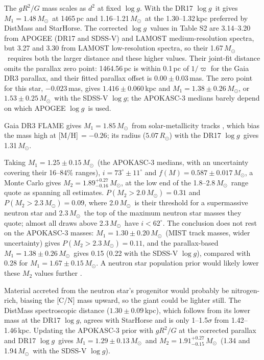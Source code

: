\documentclass{aastex701}
\newcommand{\msun}{\ensuremath{M_\odot}}
\newcommand{\rsun}{\ensuremath{R_\odot}}
\newcommand{\logg}{\ensuremath{\log g}}
\begin{document}
The $gR^2/G$ mass scales as $d^2$ at fixed \logg. With the DR17 \logg\ it gives $M_1=1.48$\,\msun\ at 1465\,pc and 1.16--1.21\,\msun\ at the 1.30--1.32\,kpc preferred by DistMass and StarHorse. The corrected \logg\ values in Table S2 are 3.14--3.20 from APOGEE (DR17 and SDSS-V) and LAMOST medium-resolution spectra, but 3.27 and 3.30 from LAMOST low-resolution spectra, so their 1.67\,\msun\ requires both the larger distance and these higher values. Their joint-fit distance omits the parallax zero point: 1464.56\,pc is within 0.1\,pc of $1/\varpi$ for the Gaia DR3 \citep{GaiaDR3} parallax, and their fitted parallax offset is $0.00\pm0.03$\,mas. The \citet{Lindegren2021} zero point for this star, $-0.023$\,mas, gives $1.416\pm0.060$\,kpc and $M_1=1.38\pm0.26$\,\msun, or $1.53\pm0.25$\,\msun\ with the SDSS-V \logg; the APOKASC-3 medians barely depend on which APOGEE \logg\ is used.

Gaia DR3 FLAME gives $M_1=1.85$\,\msun\ from solar-metallicity tracks \citep{Creevey2023}, which bias the mass high at [M/H]$\,=-0.26$; its radius ($5.07$\,\rsun) with the DR17 \logg\ gives 1.31\,\msun.

Taking $M_1=1.25\pm0.15$\,\msun\ (the APOKASC-3 medians, with an uncertainty covering their 16--84\% ranges), $i=73^\circ\pm11^\circ$ and $f(M)=0.587\pm0.017$\,\msun, a Monte Carlo gives $M_2=1.89^{+0.27}_{-0.16}$\,\msun, at the low end of the 1.8--2.8\,\msun\ range \citet{Zhao2026} quote as spanning all estimates. $P(M_2>2.0\,\msun)=0.31$ and $P(M_2>2.3\,\msun)=0.09$, where 2.0\,\msun\ is their threshold for a supermassive neutron star and 2.3\,\msun\ the top of the maximum neutron star masses they quote; almost all draws above 2.3\,\msun\ have $i<62^\circ$. The conclusion does not rest on the APOKASC-3 masses: $M_1=1.30\pm0.20$\,\msun\ (MIST track masses, wider uncertainty) gives $P(M_2>2.3\,\msun)=0.11$, and the parallax-based $M_1=1.38\pm0.26$\,\msun\ gives 0.15 (0.22 with the SDSS-V \logg), compared with 0.28 for $M_1=1.67\pm0.15$\,\msun. A neutron star population prior would likely lower these $M_2$ values further \citep{Farr2020}.

Material accreted from the neutron star's progenitor would probably be nitrogen-rich, biasing the [C/N] mass upward, so the giant could be lighter still. The DistMass spectroscopic distance ($1.30\pm0.09$\,kpc), which follows from its lower mass at the DR17 \logg, agrees with StarHorse and is only 1--1.5$\sigma$ from 1.42--1.46\,kpc. Updating the APOKASC-3 prior with $gR^2/G$ at the corrected parallax and DR17 \logg\ gives $M_1=1.29\pm0.13$\,\msun\ and $M_2=1.91^{+0.27}_{-0.15}$\,\msun\ (1.34 and 1.94\,\msun\ with the SDSS-V \logg).
\end{document}
